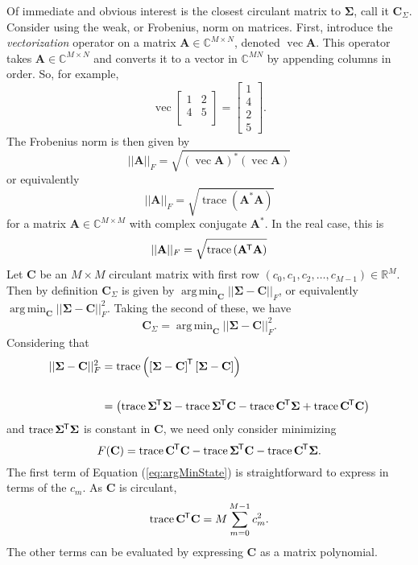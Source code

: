 \documentclass[letterpaper,12pt,oneside,final]{article}
\newcommand{\m}[1]{\mathbf{#1}}               %
\newcommand{\sm}[1]{\boldsymbol{#1}}   %
\newcommand{\tr}[1]{{#1}^{\mkern-1.5mu\mathsf{T}}}              %
\newcommand{\conj}[1]{{#1}^{\ast}}
\newcommand{\norm}[1]{||{#1}||}              %
\newcommand{\frob}[1]{\norm{#1}_F}
\newcommand*{\mvec}{\operatorname{vec}}
\newcommand*{\trace}{\operatorname{trace}}
\DeclareMathOperator*{\argmin}{arg\,min}
\newcommand{\field}[1]{\mathbb{#1}}
\newcommand{\Reals}{\field{R}}
\newcommand{\Complex}{\field{C}}
\begin{document}
Of immediate and obvious interest is the closest circulant matrix to $\sm{\Sigma}$, call it $\m{C}_{\Sigma}$. Consider using the weak, or Frobenius, norm on matrices. First, introduce the \textit{vectorization} operator on a matrix $\m{A} \in \Complex^{M \times N}$, denoted $\mvec{\m{A}}$. This operator takes $\m{A} \in \Complex^{M \times N}$ and converts it to a vector in $\Complex^{MN}$ by appending columns in order. So, for example,
$$\mvec{\begin{bmatrix}
    1 & 2  \\
    4 & 5  \\
  \end{bmatrix}} =
\begin{bmatrix}
  1 \\ 4 \\ 2 \\ 5
  \end{bmatrix}.$$
The Frobenius norm is then given by
$$\frob{\m{A}} = \sqrt{\conj{(\mvec{\m{A}})} (\mvec{\m{A}})}$$
or equivalently
$$\frob{\m{A}} = \sqrt{\trace \left ( \conj{\m{A}} \m{A} \right )}$$
for a matrix $\m{A} \in \Complex^{M \times M}$ with complex conjugate $\conj{\m{A}}$. In the real case, this is
$$\frob{\m{A}} = \sqrt{\trace \left ( \tr{\m{A}} \m{A} \right )}$$
Let $\m{C}$ be an $M \times M$ circulant matrix with first row $( c_0, c_1, c_2, \dots, c_{M-1} ) \in \Reals^M$. Then by definition $\m{C}_{\Sigma}$ is given by $\argmin_{\m{C}} \frob{\sm{\Sigma} - \m{C}}$, or equivalently $\argmin_{\m{C}} \frob{\sm{\Sigma} - \m{C}}^2$. Taking the second of these, we have
\begin{equation} \label{eq:argMinDef}
  \m{C}_{\Sigma} = \argmin_{\m{C}} \frob{\sm{\Sigma} - \m{C}}^2.
\end{equation}
Considering that
\begin{equation*}
  \begin{split}
    \frob{\sm{\Sigma} - \m{C}}^2 & = \trace \left ( \tr{\left [ \sm{\Sigma} - \m{C} \right ]} \left [ \sm{\Sigma} - \m{C} \right ] \right ) \\
    & \\
    & = \left ( \trace \tr{\sm{\Sigma}} \sm{\Sigma} - \trace \tr{\sm{\Sigma}} \m{C} - \trace \tr{\m{C}} \sm{\Sigma} + \trace \tr{\m{C}} \m{C} \right )
  \end{split}
\end{equation*}
and $\trace \tr{\sm{\Sigma}} \sm{\Sigma}$ is constant in $\m{C}$, we need only consider minimizing
\begin{equation} \label{eq:argMinState}
  F(\m{C}) = \trace \tr{\m{C}} \m{C} - \trace \tr{\sm{\Sigma}} \m{C} - \trace \tr{\m{C}} \sm{\Sigma}.
\end{equation}
The first term of Equation (\ref{eq:argMinState}) is straightforward to express in terms of the $c_m$. As $\m{C}$ is circulant,
$$\trace \tr{\m{C}} \m{C} = M \sum_{m = 0}^{M-1} c_m^2.$$
The other terms can be evaluated by expressing $\m{C}$ as a matrix polynomial.
\end{document}
